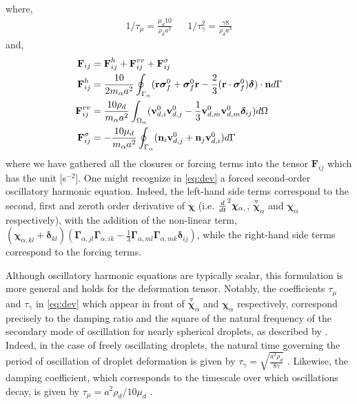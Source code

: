 where,
\begin{align}
    1/\tau_\mu 
    =
    \frac{\mu_d 10}{\rho_d a^2}  
    &&
    1/\tau_\gamma^2
    = 
    \frac{\gamma 8 }{\rho_d a^3} 
\end{align}
and,
\begin{align}
    \textbf{F}_{ij}
    &= 
    \textbf{F}_{ij}^h
    +\textbf{F}_{ij}^{vv}
    + \textbf{F}_{ij}^{\sigma}\\
    \textbf{F}_{ij}^h
    &= \frac{10}{2m_\alpha a^2}\oint_{\Gamma_{\alpha}} (\textbf{r}\bm\sigma_f^0 + \bm\sigma_f^0\textbf{r} - \frac{2}{3}(\textbf{r}\cdot \bm\sigma_f^0) \bm\delta)\cdot \textbf{n} d\Gamma \\
    \textbf{F}_{ij}^{vv}
    &= 
    \frac{10 \rho_d}{m_\alpha a^2}\int_{\Omega_{\alpha}} (\textbf{v}_{d,i}^0\textbf{v}_{d,j}^0 - \frac{1}{3}\textbf{v}_{d,m}^0\textbf{v}_{d,m}^0 \bm\delta_{ij})  d\Omega\\
    \textbf{F}_{ij}^{\sigma}
    &= - \frac{ 10 \mu_d}{m_\alpha a^2} \oint_{\Gamma_{\alpha}} (\textbf{n}_i \textbf{v}_{d,j}^0 + \textbf{n}_j \textbf{v}_{d,i}^0) d\Gamma\nonumber
\end{align}
where we have gathered all the closures or forcing terms into the tensor $\textbf{F}_{ij}$ which has the unit [s$^{-2}$]. 
One might recognize in \ref{eq:dev} a forced second-order oscillatory harmonic equation.
Indeed, the left-hand side terms correspond to the second, first and zeroth order derivative of $\bm\chi$ (i.e. $\frac{d}{dt}^2 \bm\chi_{\alpha,}$, $\overset{ \triangledown  }{\bm\chi}_\alpha$ and $\bm\chi_\alpha$ respectively), with the addition of the non-linear term, $ (\bm\chi_{\alpha,kl}+\bm\delta_{kl}) 
(\bm\Gamma_{\alpha,jl}\bm\Gamma_{\alpha,ik}  
- \frac{1}{3}
\bm\Gamma_{\alpha,ml}\bm\Gamma_{\alpha,mk}  
\bm\delta_{ij}
)$, while the right-hand side terms correspond to the forcing terms. 

Although oscillatory harmonic equations are typically scalar, this formulation is more general and holds for the deformation tensor. 
Notably, the coefficients $\tau_\mu$ and $\tau_\gamma$ in \ref{eq:dev} which appear in front of $\overset{ \triangledown  }{\bm\chi}_\alpha$ and $\bm\chi_\alpha$ respectively, correspond precisely to the damping ratio and the square of the natural frequency of the secondary mode of oscillation for nearly spherical droplets, as described by \citep{lamb1924hydrodynamics}. 
Indeed, in the case of freely oscillating droplets, the natural time governing the period of oscillation of droplet deformation is given by $\tau_\gamma = \sqrt{\frac{a^3\rho_d}{8 \gamma }}$ \citep{lamb1924hydrodynamics}. 
Likewise, the damping coefficient, which corresponds to the timescale over which oscillations decay, is given by  $\tau_\mu = a^2\rho_d/10 \mu_d$ \citep{lamb1924hydrodynamics}. 


